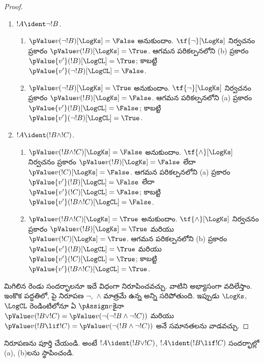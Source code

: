 \documentclass[../../../include/open-logic-section]{subfiles}
\begin{document}
\begin{proof}
\begin{enumerate}
    ఆగమన దశలో కింది సందర్భాలను పరిశీలిద్దాం.
    \item $!A \ident \lnot !B$.
    \begin{enumerate}
      \item $\pValue v(\lnot!B)[\LogKs] = \False$
      అనుకుందాం. $\tf{\lnot}[\LogKs]$ నిర్వచనం
      ప్రకారం $\pValue v(!B)[\LogKs]  =
      \True$. ఆగమన పరికల్పనలోని (b) ప్రకారం
      $\pValue {v'}(!B)[\LogCL]  = \True$;
      కాబట్టి $\pValue {v'}(\lnot !B)[\LogCL] = \False$.
      \item $\pValue v(\lnot!B)[\LogKs] = \True$
      అనుకుందాం. $\tf{\lnot}[\LogKs]$ నిర్వచనం
      ప్రకారం $\pValue v(!B)[\LogKs]  =
      \False$. ఆగమన పరికల్పనలోని (a) ప్రకారం
      $\pValue {v'}(!B)[\LogCL]  = \False$;
      కాబట్టి $\pValue {v'}(\lnot !B)[\LogCL] = \True$.
    \end{enumerate}

    \item $!A \ident (!B \land !C)$.
    \begin{enumerate}
      \item $\pValue v(!B \land !C)[\LogKs] = \False$
      అనుకుందాం. $\tf{\land}[\LogKs]$ నిర్వచనం
      ప్రకారం $\pValue v(!B)[\LogKs]  =
      \False$ లేదా $\pValue v(!C)[\LogKs]  =
      \False$. ఆగమన పరికల్పనలోని (a) ప్రకారం
      $\pValue {v'}(!B)[\LogCL]  = \False$
      లేదా $\pValue {v'}(!C)[\LogCL]  = \False$;
      కాబట్టి $\pValue {v'}(!B \land
      !C)[\LogCL] = \False$.
      \item $\pValue v(!B \land !C)[\LogKs] = \True$
      అనుకుందాం. $\tf{\land}[\LogKs]$ నిర్వచనం
      ప్రకారం $\pValue v(!B)[\LogKs]  =
      \True$ మరియు $\pValue v(!C)[\LogKs]  =
      \True$. ఆగమన పరికల్పనలోని (b) ప్రకారం
      $\pValue {v'}(!B)[\LogCL]  = \True$
      మరియు $\pValue {v'}(!C)[\LogCL]  = \True$;
      కాబట్టి $\pValue {v'}(!B \land
      !C)[\LogCL] = \True$.
    \end{enumerate}
  \end{enumerate}

  మిగిలిన రెండు సందర్భాలనూ ఇదే విధంగా నిరూపించవచ్చు.
వాటిని అభ్యాసంగా వదిలేస్తాం. ఇంకొక పద్ధతిలో, పై నిరూపణ
$\lnot$,~$\land$ మాత్రమే ఉన్న అన్ని
 సరిపోతుంది. ఇప్పుడు $\LogKs$,
$\LogCL$ రెండింటిలోనూ ఏ $\pAssign v$కైనా
$\pValue v(!B \lor
  !C) = \pValue v(\lnot(\lnot!B \land \lnot !C))$
మరియు $\pValue v(!B \lif
  !C) = \pValue v(\lnot(!B \land \lnot !C))$
అనే సమానతలను వాడవచ్చు.
\end{proof}

\begin{prob}
  నిరూపణను పూర్తి చేయండి. అంటే
  $!A \ident (!B \lor !C)$, $!A \ident (!B \lif !C)$
  సందర్భాల్లో (a), (b)లను స్థాపించండి.
\end{prob}
\end{document}
